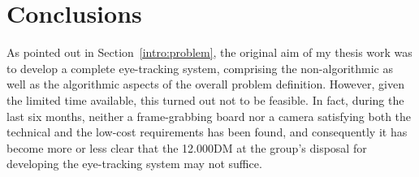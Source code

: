 
\cleardoublepage
\chapter{Conclusions}
\label{concl}

As pointed out in Section~\ref{intro:problem}, the original aim of my
thesis work was to develop a complete eye-tracking system, comprising
the non-algorithmic as well as the algorithmic aspects of the overall
problem definition.  However, given the limited time available, this
turned out not to be feasible.  In fact, during the last six months,
neither a frame-grabbing board nor a camera satisfying both the
technical and the low-cost requirements has been found, and
consequently it has become more or less clear that the 12.000DM at the
group's disposal for developing the eye-tracking system may not
suffice.



